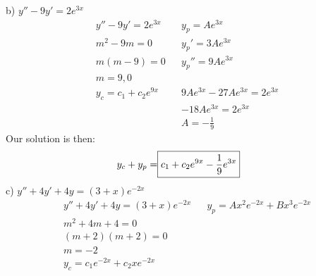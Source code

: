 \documentclass{article}
\begin{document}
b) $ y'' - 9y' = 2e^{3x }$
\begin{align*}
    & y'' - 9y' = 2e^{3x} && y_p = Ae^{3x}\\
    & m^2 - 9m = 0 && y_p' = 3Ae^{3x}\\
    & m(m-9) = 0 && y_p'' = 9Ae^{3x} \\
    & m = 9, 0 \\
    & y_c = c_1 + c_2e^{9x} && 9Ae^{3x} - 27Ae^{3x} = 2e^{3x} \\
    &&& -18Ae^{3x} = 2e^{3x} \\
    &&& A = -\frac{1}{9}
\end{align*}
Our solution is then:
\begin{align*}
    y_c + y_p = \Aboxed{c_1 + c_2e^{9x} - \frac{1}{9}e^{3x}}
\end{align*}
c) $ y'' + 4y' + 4y = (3+x)e^{-2x}$
\begin{align*}
    & y'' + 4y' + 4y = (3+x)e^{-2x} && y_p = Ax^2e^{-2x} + Bx^3e^{-2x}\\
    & m^2 + 4m + 4 = 0 \\
    & (m+2)(m+2) = 0 \\
    & m = -2 \\
    & y_c = c_1e^{-2x} + c_2xe^{-2x}
\end{align*}
\end{document}

